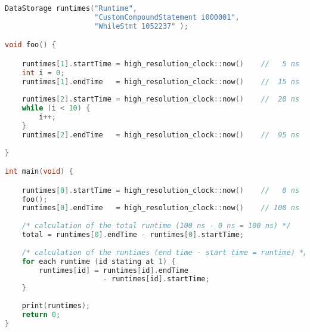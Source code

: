 \begin{lstlisting}[float, language=C++, caption=Example Code for Measuring and Calculating Time Values., label=lst:b:time_measurement]
DataStorage runtimes("Runtime", 
                     "CustomCompoundStatement i000001", 
                     "WhileStmt 1052237" );

void foo() {

    runtimes[1].startTime = high_resolution_clock::now()    //   5 ns
    int i = 0;
    runtimes[1].endTime   = high_resolution_clock::now()    //  15 ns
    
    runtimes[2].startTime = high_resolution_clock::now()    //  20 ns
    while (i < 10) {
        i++;
    }
    runtimes[2].endTime   = high_resolution_clock::now()    //  95 ns
    
}

int main(void) {

    runtimes[0].startTime = high_resolution_clock::now()    //   0 ns 
    foo();
    runtimes[0].endTime   = high_resolution_clock::now()    // 100 ns
    
    /* calculation of the total runtime (100 ns - 0 ns = 100 ns) */
    total = runtimes[0].endTime - runtimes[0].startTime;
    
    /* calculation of the runtimes (end time - start time = runtime) */
    for each runtime (id stating at 1) {
        runtimes[id] = runtimes[id].endTime 
                       - runtimes[id].startTime; 
    }
    
    print(runtimes);
    return 0;
}
\end{lstlisting}

\newpage
